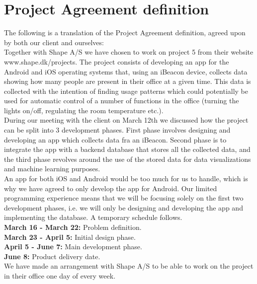 \documentclass[12pt]{article}
\begin{document}
\newpage
\section{Project Agreement definition}

The following is a translation of the Project Agreement definition, agreed upon by both our client and ourselves:\\

Together with Shape A/S we have chosen to work on project 5 from their website www.shape.dk/projects. The project consists of developing an app for the Android and iOS operating systems that, using an iBeacon device, collects data showing how many people are present in their office at a given time. This data is collected with the intention of finding usage patterns which could potentially be used for automatic control of a number of functions in the office (turning the lights on/off, regulating the room temperature etc.).\\

During our meeting with the client on March 12th we discussed how the project can be split into 3 development phases. First phase involves designing and developing an app which collects data fra an iBeacon. Second phase is to integrate the app with a backend database that stores all the collected data, and the third phase revolves around the use of the stored data for data visualizations and machine learning purposes.\\

An app for both iOS and Android would be too much for us to handle, which is why we have agreed to only develop the app for Android. Our limited programming experience means that we will be focusing solely on the first two development phases, i.e. we will only be designing and developing the app and implementing the database. A temporary schedule follows.\\

\textbf{March 16 - March 22:} Problem definition.\\
\textbf{March 23 - April 5:} Initial design phase.\\
\textbf{April 5 - June 7:} Main development phase.\\
\textbf{June 8:} Product delivery date.\\

We have made an arrangement with Shape A/S to be able to work on the project in their office one day of every week.\\
\end{document}
